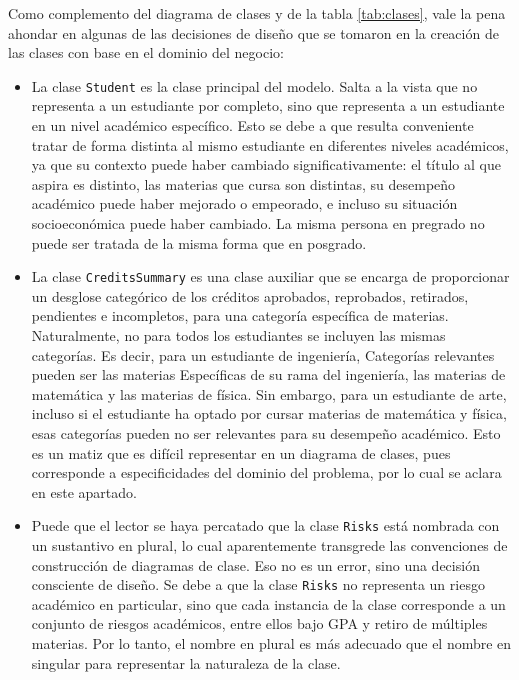 Como complemento del diagrama de clases y de la tabla \ref{tab:clases}, vale la pena ahondar en algunas de las decisiones de diseño que se tomaron en la creación de las clases con base en el dominio del negocio:
\begin{itemize}
	\item La clase \texttt{Student} es la clase principal del modelo. Salta a la vista que no representa a un estudiante por completo, sino que representa a un estudiante en un nivel académico específico. Esto se debe a que resulta conveniente tratar de forma distinta al mismo estudiante en diferentes niveles académicos, ya que su contexto puede haber cambiado significativamente: el título al que aspira es distinto, las materias que cursa son distintas, su desempeño académico puede haber mejorado o empeorado, e incluso su situación socioeconómica puede haber cambiado. La misma persona en pregrado no puede ser tratada de la misma forma que en posgrado.
	\item La clase \texttt{CreditsSummary} es una clase auxiliar que se encarga de proporcionar un desglose categórico de los créditos aprobados, reprobados, retirados, pendientes e incompletos, para una categoría específica de materias. Naturalmente, no para todos los estudiantes se incluyen las mismas categorías. Es decir, para un estudiante de ingeniería, Categorías relevantes pueden ser las materias Específicas de su rama del ingeniería, las materias de matemática y las materias de física. Sin embargo, para un estudiante de arte, incluso si el estudiante ha optado por cursar materias de matemática y física, esas categorías pueden no ser relevantes para su desempeño académico. Esto es un matiz que es difícil representar en un diagrama de clases, pues corresponde a especificidades del dominio del problema, por lo cual se aclara en este apartado.
	\item Puede que el lector se haya percatado que la clase \texttt{Risks} está nombrada con un sustantivo en plural, lo cual aparentemente transgrede las convenciones de construcción de diagramas de clase. Eso no es un error, sino una decisión consciente de diseño. Se debe a que la clase \texttt{Risks} no representa un riesgo académico en particular, sino que cada instancia de la clase corresponde a un conjunto de riesgos académicos, entre ellos bajo GPA y retiro de múltiples materias. Por lo tanto, el nombre en plural es más adecuado que el nombre en singular para representar la naturaleza de la clase.
\end{itemize}

